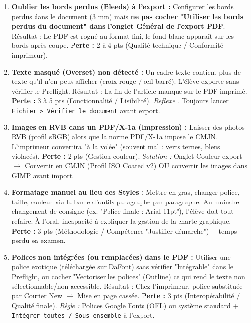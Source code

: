 \documentclass[11pt]{article}
\begin{document}
\begin{attention}
    \begin{enumerate}
        \item \textbf{Oublier les bords perdus (Bleeds) à l'export :} Configurer les bords perdus dans le document (3 mm) mais \textbf{ne pas cocher "Utiliser les bords perdus du document" dans l'onglet Général de l'export PDF}. Résultat : Le PDF est rogné au format fini, le fond blanc apparaît sur les bords après coupe. \textbf{Perte :} 2 à 4 pts (Qualité technique / Conformité imprimeur).
        \item \textbf{Texte masqué (Overset) non détecté :} Un cadre texte contient plus de texte qu'il n'en peut afficher (croix rouge / œil barré). L'élève exporte sans vérifier le Preflight. Résultat : La fin de l'article manque sur le PDF imprimé. \textbf{Perte :} 3 à 5 pts (Fonctionnalité / Lisibilité). \emph{Reflexe :} Toujours lancer \texttt{Fichier > Vérifier le document} avant export.
        \item \textbf{Images en RVB dans un PDF/X-1a (Impression) :} Laisser des photos RVB (profil sRGB) alors que la norme PDF/X-1a impose le CMJN. L'imprimeur convertira "à la volée" (souvent mal : verts ternes, bleus violacés). \textbf{Perte :} 2 pts (Gestion couleur). \emph{Solution :} Onglet Couleur export $\rightarrow$ Convertir en CMJN (Profil ISO Coated v2) OU convertir les images dans GIMP avant import.
        \item \textbf{Formatage manuel au lieu des Styles :} Mettre en gras, changer police, taille, couleur via la barre d'outils paragraphe par paragraphe. Au moindre changement de consigne (ex. "Police finale : Arial 11pt"), l'élève doit tout refaire. À l'oral, incapacité à expliquer la gestion de la charte graphique. \textbf{Perte :} 3 pts (Méthodologie / Compétence "Justifier démarche") + temps perdu en examen.
        \item \textbf{Polices non intégrées (ou remplacées) dans le PDF :} Utiliser une police exotique (téléchargée sur DaFont) sans vérifier "Intégrable" dans le Preflight, ou cocher "Vectoriser les polices" (Outline) ce qui rend le texte non sélectionnable/non accessible. Résultat : Chez l'imprimeur, police substituée par Courier New $\rightarrow$ Mise en page cassée. \textbf{Perte :} 3 pts (Interopérabilité / Qualité finale). \emph{Règle :} Polices Google Fonts (OFL) ou système standard + \texttt{Intégrer toutes / Sous-ensemble} à l'export.
    \end{enumerate}
\end{attention}
\end{document}
